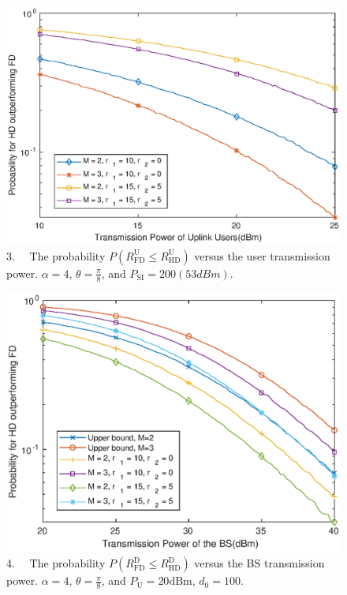 \documentclass[aspectratio=169]{beamer}
\begin{document}
\begin{frame}
	\begin{figure}
		\centering
		\includegraphics[width=0.7\linewidth]{images/3.eps}
		\caption{3.$\quad$ The probability $P(R_{\text{FD}}^{\text{U}}\leqslant R_{\text{HD}}^{\text{U}})$ versus the user transmission power. $\alpha = 4$, $\theta = \frac{\pi}{8}$, and $P_{\text{SI}} = 200(53dBm)$.}
		\label{fig:fig3}
	\end{figure}
\end{frame}

\begin{frame}
		\begin{figure}
			\centering
			\includegraphics[width=0.65\linewidth]{images/4.eps}
			\caption{4.$\quad$ The probability $P(R_{\text{FD}}^{\text{D}}\leqslant R_{\text{HD}}^{\text{D}})$ versus the BS transmission power. $\alpha = 4$, $\theta = \frac{\pi}{8}$, and $P_{\text{U}} = 20\text{dBm}$, $d_0 = 100$.}
			\label{fig:fig4}
		\end{figure}
\end{frame}
	
\end{document}
